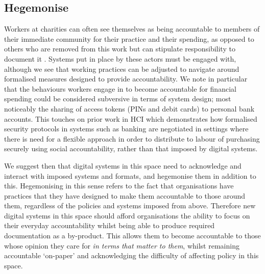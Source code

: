 \subsection{Hegemonise}
Workers at charities can often see themselves as being accountable to members of their immediate community for their practice and their spending, as opposed to others who are removed from this work but can stipulate responsibility to document it \cite{koppell_pathologies_2005}. Systems put in place by these actors must be engaged with, although we see that working practices can be adjusted to navigate around formalised measures designed to provide accountability. We note in particular that the behaviours workers engage in to become accountable for financial spending could be considered subversive in terms of system design; most noticeably the sharing of access tokens (PINs and debit cards) to personal bank accounts. This touches on prior work in HCI \cite{vines_eighty_2011} which demonstrates how formalised security protocols in systems such as banking are negotiated in settings where there is need for a flexible approach in order to distribute to labour of purchasing securely using social accountability, rather than that imposed by digital systems.

We suggest then that digital systems in this space need to acknowledge and interact with imposed systems and formats, and hegemonise them in addition to this. Hegemonising in this sense refers to the fact that organisations have practices that they have designed to make them accountable to those around them, regardless of the policies and systems imposed from above. Therefore new digital systems in this space should afford organisations the ability to focus on their everyday accountability whilst being able to produce required documentation as a by-product. This allows them to become accountable to those whose opinion they care for \textit{in terms that matter to them}, whilst remaining accountable `on-paper' and acknowledging the difficulty of affecting policy in this space.

